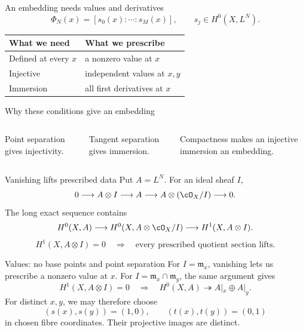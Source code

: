 \begin{frame}{An embedding needs values and derivatives}
\[
\Phi_N(x)=[s_0(x):\cdots:s_M(x)],\qquad s_j\in H^0(X,L^N).
\]
\par\bigskip
\begin{center}
\renewcommand{\arraystretch}{1.6}
\begin{tabular}{ll}
What we need & What we prescribe\\
\hline
Defined at every \(x\) & a nonzero value at \(x\)\\
Injective & independent values at \(x,y\)\\
Immersion & all first derivatives at \(x\)
\end{tabular}
\end{center}
\end{frame}

\begin{frame}{Why these conditions give an embedding}
\begin{columns}[c]
\centering
{}
Point separation gives injectivity.
\par\bigskip
Tangent separation gives immersion.
\par\bigskip
Compactness makes an injective immersion an embedding.
\end{columns}
\end{frame}

\begin{frame}{Vanishing lifts prescribed data}
Put \(A=L^N\). For an ideal sheaf \(I\),
\[
0\longrightarrow A\otimes I\longrightarrow A
\longrightarrow A\otimes(\cO_X/I)\longrightarrow0.
\]
The long exact sequence contains
\[
H^0(X,A)\longrightarrow H^0(X,A\otimes\cO_X/I)
\longrightarrow H^1(X,A\otimes I).
\]
\[
\boxed{H^1(X,A\otimes I)=0
\quad\Longrightarrow\quad\text{every prescribed quotient section lifts}.}
\]
\end{frame}

\begin{frame}{Values: no base points and point separation}
For \(I=\mathfrak m_x\), vanishing lets us prescribe a nonzero value at \(x\).
For \(I=\mathfrak m_x\cap\mathfrak m_y\), the same argument gives
\[
H^1(X,A\otimes I)=0
\quad\Longrightarrow\quad
H^0(X,A)\twoheadrightarrow A|_x\oplus A|_y.
\]
For distinct \(x,y\), we may therefore choose
\[
(s(x),s(y))=(1,0),\qquad
(t(x),t(y))=(0,1)
\]
in chosen fibre coordinates. Their projective images are distinct.
\end{frame}


